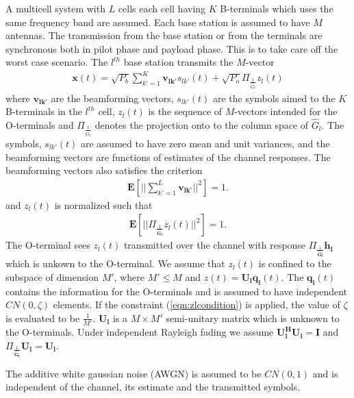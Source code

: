 \documentclass[10pt, a4paper, twoside,fleqn]{article}
\begin{document}
	A multicell system with $L$ cells each cell having $K$ B-terminals which uses the same frequency band are assumed. Each base station is assumed to have $M$ antennas. The transmission from the base station or from the terminals are synchronous both in pilot phase and payload phase. This is to take care off the worst case scenario. The $l^{th}$ base station transmits the $M$-vector
\begin{eqnarray}
	\mathbf{x}(t) = \sqrt{P_b}\sum\limits_{k'=1}^{K}\mathbf{v_{lk'}}s_{lk'}(t)
		      + \sqrt{P_o}\Pi_{\frac{1}{\hat G_l}}z_l(t)
\end{eqnarray}
where $\mathbf{v_{lk'}}$ are the beamforming vectors, $s_{lk'}(t)$ are the symbols aimed to the $K$ B-terminals in the $l^{th}$ cell, $z_l(t)$ is the sequence of $M$-vectors intended for the O-terminals and $\Pi_{\frac{1}{\hat G_l}}$ denotes the projection onto to the column space of $\hat G_l$. The symbols, $s_{lk'}(t)$ are assumed to have zero mean and unit variances, and the beamforming vectors are functions of estimates of the channel responses. 
The beamforming vectors also satisfies the criterion
\begin{eqnarray}
	\mathbf{E}\left[||\sum\limits_{k'=1}^{L}\mathbf{v_{lk'}}||^2\right]=1.
\end{eqnarray}
and $z_l(t)$ is normalized such that
\begin{eqnarray}\label{eqn:zlcondition}
	\mathbf{E}\left[||\Pi_{\frac{1}{\mathbf{\hat G_l}}}z_l(t)||^2\right]=1.
\end{eqnarray}
The O-terminal sees $z_l(t)$ transmitted over the channel with response $\Pi_{\frac{1}{\mathbf{\hat G_l}}}\mathbf{h_l}$ which is unkown to the O-terminal. We assume that $z_l(t)$ is confined to the subspace of dimension $M'$, where $M'\leq M$ and $z(t) = \mathbf{U_lq_l}(t)$. The $\mathbf{q_l}(t)$ contains the information for the O-terminals  and is assumed to have independent $CN(0, \zeta)$ elements. If the constraint (\ref{eqn:zlcondition}) is applied, the value of $\zeta$ is evaluated to be $\frac{1}{M'}$. $\mathbf{U_l}$ is a $M\times M'$ semi-unitary matrix which is unknown to the O-terminals. Under independent Rayleigh fading we assume $\mathbf{U_l^HU_l=I}$ and $\Pi_{\frac{1}{\mathbf{\hat G_l}}}\mathbf{U_l=U_l}$.

The additive white gaussian noise (AWGN) is assumed to be $CN(0,1)$ and is independent of the channel, its estimate and the transmitted symbols.
\end{document}
